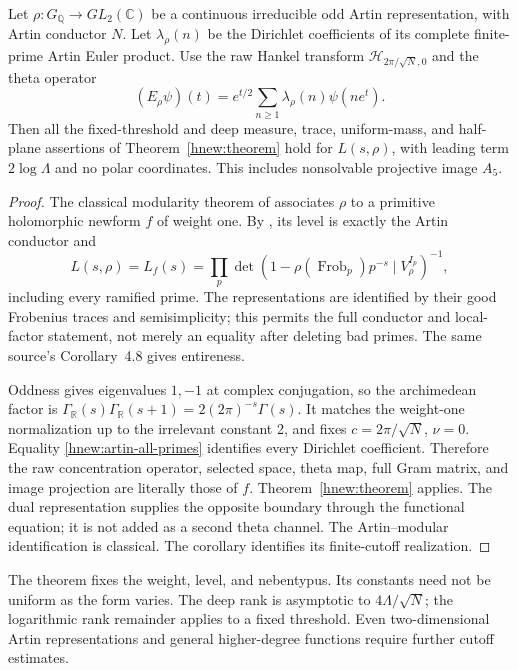 \begin{corollary}
\label{hnew:odd-artin}
Let $\rho:G_{\mathbb Q}\to GL_2(\mathbb C)$ be a continuous
irreducible odd Artin representation, with Artin conductor $N$.
Let $\lambda_\rho(n)$ be the Dirichlet coefficients of its
complete finite-prime Artin Euler product.
Use the raw Hankel transform
$\mathcal H_{2\pi/\sqrt N,0}$ and the theta operator
\[
 (E_\rho\psi)(t)
       =e^{t/2}\sum_{n\ge1}\lambda_\rho(n)\psi(ne^t).
\]
Then all the fixed-threshold and deep measure, trace, uniform-mass,
and half-plane assertions of Theorem~\ref{hnew:theorem} hold
for $L(s,\rho)$, with leading term $2\log\Lambda$ and no polar
coordinates.  This includes nonsolvable projective image $A_5$.
\end{corollary}
\begin{proof}
The classical modularity theorem of
\citet[Theorem~10.1(ii) and Corollary~10.2(ii), author-preprint
pp.~20--21]{kharewintenberger2009}
associates $\rho$ to a primitive holomorphic newform $f$ of
weight one.  By
\citet[Theorem~4.6, p.~514; proof pp.~515--516]{deligneserre1974},
its level is exactly the Artin conductor and
\begin{equation}\label{hnew:artin-all-primes}
 L(s,\rho)=L_f(s)
 =\prod_p\det(1-\rho(\operatorname{Frob}_p)p^{-s}
                       \mid V_\rho^{I_p})^{-1},
\end{equation}
including every ramified prime.
The representations are identified by their good Frobenius traces
and semisimplicity; this permits the full conductor and local-factor
statement, not merely an equality after deleting bad primes.
The same source's Corollary~4.8 gives entireness.

Oddness gives eigenvalues $1,-1$ at complex conjugation, so the
archimedean factor is
$\Gamma_{\mathbb R}(s)\Gamma_{\mathbb R}(s+1)
=2(2\pi)^{-s}\Gamma(s)$.
It matches the weight-one normalization up to the irrelevant
constant 2, and fixes $c=2\pi/\sqrt N$, $\nu=0$.
Equality \eqref{hnew:artin-all-primes} identifies every Dirichlet
coefficient.  Therefore the raw concentration operator, selected
space, theta map, full Gram matrix, and image projection are
literally those of $f$.  Theorem~\ref{hnew:theorem} applies.
The dual representation supplies the opposite boundary through
the functional equation; it is not added as a second theta channel.
The Artin--modular identification is classical.  The corollary
identifies its finite-cutoff realization.
\end{proof}

The theorem fixes the weight, level, and nebentypus.  Its constants
need not be uniform as the form varies.  The deep rank is asymptotic
to $4\Lambda/\sqrt N$; the logarithmic rank remainder applies to a
fixed threshold.  Even two-dimensional Artin representations and
general higher-degree functions require further cutoff estimates.
